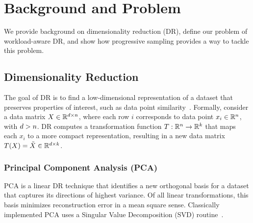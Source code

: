 \section{Background and Problem}
\label{sec:background}

We provide background on dimensionality reduction (DR), define our problem of workload-aware DR, and show how progressive sampling provides a way to tackle this problem. 

\subsection{Dimensionality Reduction}
\label{sec:defs}

The goal of DR is to find a low-dimensional representation of a dataset that preserves properties of interest, such as data point similarity~\cite{dr-survey1,dr-survey2}. Formally, consider a data matrix $X \in \mathbb{R}^{{\color{black}d} \times {\color{black}n}}$, where each row $i$ corresponds to data point $x_i \in \mathbb{R}^{\color{black}n}$, with ${\color{black}d} > {\color{black}n}$.  
DR computes a transformation function $T: \mathbb{R}^{\color{black}n} \rightarrow \mathbb{R}^k$ that maps each $x_i$ to a more compact representation, resulting in a new data matrix $T(X) = \tilde{X} \in \mathbb{R}^{{\color{black}d} \times k}$.

\subsubsection*{Principal Component Analysis (PCA)}
\label{sec:pca}
PCA is a linear DR technique that identifies a new orthogonal basis for a dataset that captures its directions of highest variance.
Of all linear transformations, this basis minimizes reconstruction error in a mean square sense. 
Classically implemented PCA uses a Singular Value Decomposition (SVD) routine~\cite{trefethen}.


